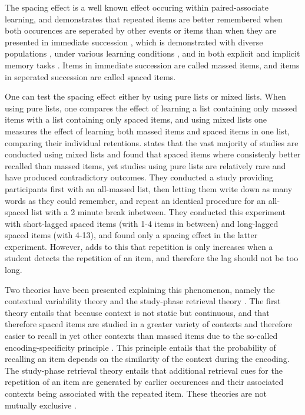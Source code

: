 The spacing effect is a well known effect occuring within paired-associate learning, and demonstrates that repeated items are better remembered when both occurences are seperated by other events or items than when they are presented in immediate succession \cite{verkoeijen, logan, siegel, xue, karpicke2}, which is demonstrated with diverse populations \cite{verkoeijen, logan}, under various learning conditions \cite{verkoeijen, logan}, and in both explicit and implicit memory tasks \cite{verkoeijen}. Items in immediate succession are called massed items, and items in seperated succession are called spaced items.

One can test the spacing effect either by using pure lists or mixed lists. When using pure lists, one compares the effect of learning a list containing only massed items with a list containing only spaced items, and using mixed lists one measures the effect of learning both massed items and spaced items in one list, comparing their individual retentions.  states that the vast majority of studies are conducted using mixed lists and found that spaced items where consistenly better recalled than massed items, yet studies using pure lists are relatively rare and have produced contradictory outcomes. They conducted a study providing participants first with an all-massed list, then letting them write down as many words as they could remember, and repeat an identical procedure for an all-spaced list with a 2 minute break inbetween. They conducted this experiment with short-lagged spaced items (with 1-4 items in between) and long-lagged spaced items (with 4-13), and found only a spacing effect in the latter experiment. However,  adds to this that repetition is only increases when a student detects the repetition of an item, and therefore the lag should not be too long.

Two theories have been presented explaining this phenomenon, namely the contextual variability theory and the study-phase retrieval theory \cite{siegel}. The first theory entails that because context is not static but continuous, and that therefore spaced items are studied in a greater variety of contexts and therefore easier to recall in yet other contexts than massed items due to the so-called encoding-specificity principle \cite{cognitivepsychology}. This principle entails that the probability of recalling an item depends on the similarity of the context during the encoding. The study-phase retrieval theory entails that additional retrieval cues for the repetition of an item are generated by earlier occurences and their associated contexts being associated with the repeated item. These theories are not mutually exclusive \cite{siegel}.

